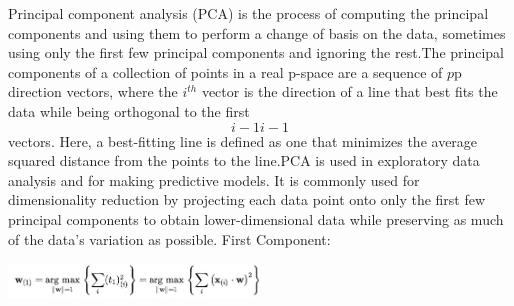 \documentclass[12pt, letterpaper]{article}
\begin{document}
\hspace*{0.25 in}Principal component analysis (PCA) is the process of computing the principal components and using them to perform a change of basis on the data, sometimes using only the first few principal components and ignoring the rest.The principal components of a collection of points in a real p-space are a sequence of ${\displaystyle p}$p direction vectors, where the $i^{th}$ vector is the direction of a line that best fits the data while being orthogonal to the first $${\displaystyle i-1}i-1$$ vectors. Here, a best-fitting line is defined as one that minimizes the average squared distance from the points to the line.PCA is used in exploratory data analysis and for making predictive models. It is commonly used for dimensionality reduction by projecting each data point onto only the first few principal components to obtain lower-dimensional data while preserving as much of the data's variation as possible.
First Component:
\begin{center}
             \includegraphics[width=0.5\textwidth]{figures/firstc.jpg}
\end{center}
\end{document}
